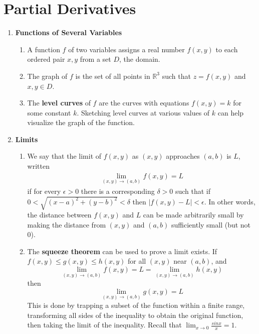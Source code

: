 \documentclass[10pt]{article}
\begin{document}
\begin{multicols*}{2}
\begin{enumerate}
\begin{enumerate}
         
    \end{enumerate}
    
    
\end{enumerate}

\section{Partial Derivatives}
\begin{enumerate}
    \item \textbf{Functions of Several Variables}
    \begin{enumerate}
        \item A function $f$ of two variables assigns a real number $f(x,y)$ to each ordered pair $x,y$ from a set $D$, the domain.
        \item The graph of $f$ is the set of all points in $\mathbb{R}^3$ such that $z=f(x,y)$ and $x,y \in D$. 
        \item The \textbf{level curves} of $f$ are the curves with equations $f(x,y)=k$ for some constant $k$. Sketching level curves at various values of $k$ can help visualize the graph of the function.
    \end{enumerate}
    \columnbreak
    \item \textbf{Limits}
    \begin{enumerate}
        \item We say that the limit of $f(x,y)$ as $(x,y)$ approaches $(a,b)$ is $L$, written
        \begin{align*}
            \lim_{(x,y) \rightarrow (a,b)} f(x,y) = L
        \end{align*}
        if for every $\epsilon > 0$ there is a corresponding $\delta > 0$ such that if $0 < \sqrt{(x-a)^2 + (y-b)^2} < \delta$ then $|f(x,y) - L| < \epsilon$. In other words, the distance between $f(x,y)$ and $L$ can be made arbitrarily small by making the distance from $(x,y)$ and $(a,b)$ sufficiently small (but not 0).
        
        \item The \textbf{squeeze theorem} can be used to prove a limit exists. If $f(x,y) \leq g(x,y) \leq h(x,y)$  for all $(x,y)$ near $(a,b)$, and $$\lim_{(x,y) \rightarrow (a,b)} f(x,y) = L = \lim_{(x,y) \rightarrow (a,b)} h(x,y)$$ then $$\lim_{(x,y) \rightarrow (a,b)} g(x,y) = L$$ This is done by trapping a subset of the function within a finite range, transforming all sides of the inequality to obtain the original function, then taking the limit of the inequality. Recall that $\lim_{x \rightarrow 0} \frac{sin{x}}{x} = 1$. 
        

\end{enumerate}
\end{enumerate}
\end{multicols*}
\end{document}
